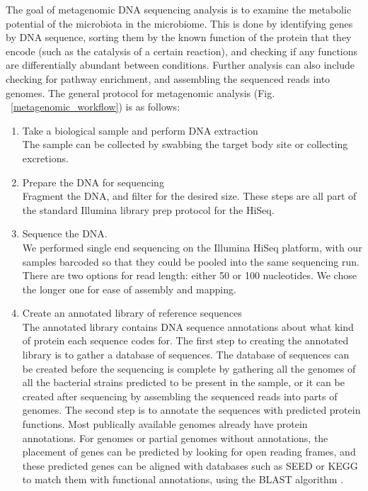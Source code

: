 The goal of metagenomic DNA sequencing analysis is to examine the metabolic potential of the microbiota in the microbiome. This is done by identifying genes by DNA sequence, sorting them by the known function of the protein that they encode (such as the catalysis of a certain reaction), and checking if any functions are differentially abundant between conditions. Further analysis can also include checking for pathway enrichment, and assembling the sequenced reads into genomes. The general protocol for metagenomic analysis (Fig. ~\ref{metagenomic_workflow}) is as follows:

\begin{enumerate}
\item Take a biological sample and perform DNA extraction\\
The sample can be collected by swabbing the target body site or collecting excretions.

\item Prepare the DNA for sequencing\\
Fragment the DNA, and filter for the desired size. These steps are all part of the standard Illumina library prep protocol for the HiSeq.

\item Sequence the DNA.\\
We performed single end sequencing on the Illumina HiSeq platform, with our samples barcoded so that they could be pooled into the same sequencing run. There are two options for read length: either 50 or 100 nucleotides. We chose the longer one for ease of assembly and mapping.

\item Create an annotated library of reference sequences\\
The annotated library contains DNA sequence annotations about what kind of protein each sequence codes for. The first step to creating the annotated library is to gather a database of sequences. The database of sequences can be created before the sequencing is complete by gathering all the genomes of all the bacterial strains predicted to be present in the sample, or it can be created after sequencing by assembling the sequenced reads into parts of genomes. The second step is to annotate the sequences with predicted protein functions. Most publically available genomes already have protein annotations. For genomes or partial genomes without annotations, the placement of genes can be predicted by looking for open reading frames, and these predicted genes can be aligned with databases such as SEED \cite{overbeek2005subsystems} or KEGG \cite{kanehisa2000kegg} to match them with functional annotations, using the BLAST algorithm \cite{altschul1990basic}.


\end{enumerate}

